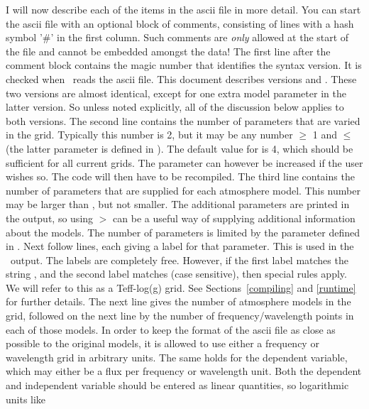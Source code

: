 I will now describe each of the items in the ascii file in more detail. You
can start the ascii file with an optional block of comments, consisting of
lines with a hash symbol '\#' in the first column. Such comments are {\em only}
allowed at the start of the file and cannot be embedded amongst the data! The
first line after the comment block contains the magic number that identifies
the syntax version. It is checked
when \Cloudy\ reads the ascii file. This document describes versions
 and . These two versions are
almost identical, except for one extra model parameter in the latter version.
So unless noted explicitly, all of the discussion below applies to both
versions. The second line contains the number of parameters
 that are varied in the grid. Typically this number is 2, but
it may be any number $\geq$ 1 and $\leq$  (the latter
parameter is defined in ). The default value for
 is 4, which should be sufficient for all current grids. The
parameter can however be increased if the user wishes so. The code
will then have to be recompiled. The third line
contains the number of parameters  that are supplied for each
atmosphere model. This number may be larger than , but not
smaller. The additional parameters are printed in the output, so using
 $>$  can be a useful way of supplying
additional information about the models. The number of parameters is limited
by the parameter  defined in . Next
follow  lines, each giving a label for that parameter. This
is used in the \Cloudy\ output. The labels are completely free. However, if the
first label matches the string , and the second label matches
 (case sensitive), then special rules apply. We will refer
to this as a Teff-log(g) grid. See Sections~\ref{compiling} and \ref{runtime}
for further details. The next line gives the number of atmosphere models
 in the grid, followed on the next line by the number of
frequency/wavelength points  in each of those models. In
order to keep the format of the ascii file as close as possible to the
original models, it is allowed to use either a frequency or wavelength grid in
arbitrary units. The same holds for the dependent variable, which may either
be a flux per frequency or wavelength unit. Both the dependent and independent
variable should be entered as linear quantities, so logarithmic units like
